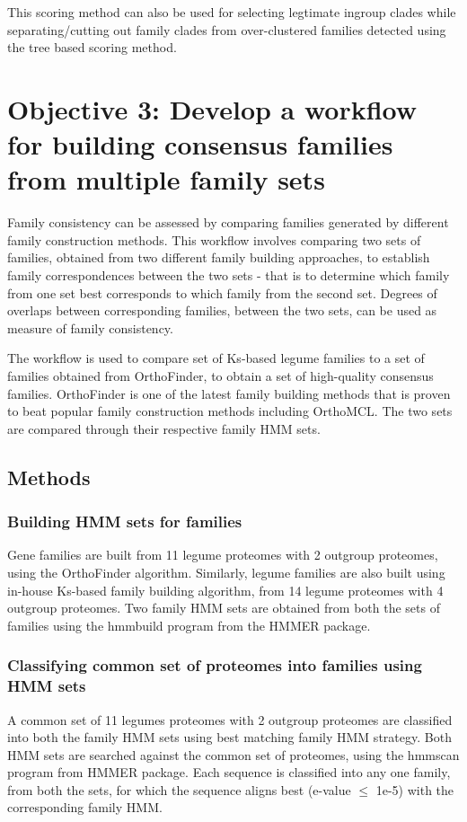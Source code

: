 \documentclass{article}
\begin{document}
		This scoring method can also be used for selecting legtimate ingroup clades while separating/cutting out family clades from over-clustered families detected using the tree based scoring method.
		
		
	\clearpage
	\section{Objective 3: Develop a workflow for building consensus families from multiple family sets}
	Family consistency can be assessed by comparing families generated by different family construction methods. This workflow involves comparing two sets of families, obtained from two different family building approaches, to establish family correspondences between the two sets - that is to determine which family from one set best corresponds to which family from the second set. Degrees of overlaps between corresponding families, between the two sets, can be used as measure of family consistency.
	
	The workflow is used to compare set of Ks-based legume families to a set of families obtained from OrthoFinder, to obtain a set of high-quality consensus families. OrthoFinder is one of the latest family building methods that is proven to beat popular family construction methods including OrthoMCL. The two sets are compared through their respective family HMM sets.
	
		\subsection{Methods}
			\subsubsection{Building HMM sets for families}
			Gene families are built from 11 legume proteomes with 2 outgroup proteomes, using the OrthoFinder algorithm. Similarly, legume families are also built using in-house Ks-based family building algorithm, from 14 legume proteomes with 4 outgroup proteomes. Two family HMM sets are obtained from both the sets of families using the hmmbuild program from the HMMER package.
			
			\subsubsection{Classifying common set of proteomes into families using HMM sets}
			A common set of 11 legumes proteomes with 2 outgroup proteomes are classified into both the family HMM sets using best matching family HMM strategy. Both HMM sets are searched against the common set of proteomes, using the hmmscan program from HMMER package. Each sequence is classified into any one family, from both the sets, for which the sequence aligns best (e-value $\leq$ 1e-5) with the corresponding family HMM.
			
\end{document}
